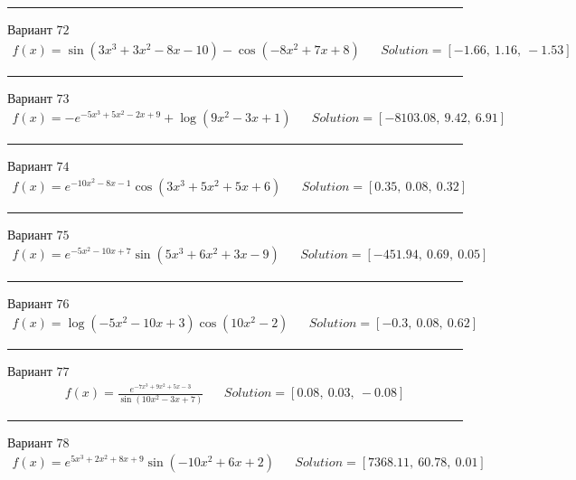 \documentclass[11pt]{report}
\begin{document}
\begin{center}
    \noindent\rule{8cm}{0.4pt}
\end{center}
Вариант \(72\)
\begin{align*}
    f(x) = \sin{\left(3 x^{3} + 3 x^{2} - 8 x - 10 \right)} - \cos{\left(- 8 x^{2} + 7 x + 8 \right)} && Solution = \left[ -1.66, \  1.16, \  -1.53\right]
\end{align*}
\begin{center}
    \noindent\rule{8cm}{0.4pt}
\end{center}
Вариант \(73\)
\begin{align*}
    f(x) = - e^{- 5 x^{3} + 5 x^{2} - 2 x + 9} + \log{\left(9 x^{2} - 3 x + 1 \right)} && Solution = \left[ -8103.08, \  9.42, \  6.91\right]
\end{align*}
\begin{center}
    \noindent\rule{8cm}{0.4pt}
\end{center}
Вариант \(74\)
\begin{align*}
    f(x) = e^{- 10 x^{2} - 8 x - 1} \cos{\left(3 x^{3} + 5 x^{2} + 5 x + 6 \right)} && Solution = \left[ 0.35, \  0.08, \  0.32\right]
\end{align*}
\begin{center}
    \noindent\rule{8cm}{0.4pt}
\end{center}
Вариант \(75\)
\begin{align*}
    f(x) = e^{- 5 x^{2} - 10 x + 7} \sin{\left(5 x^{3} + 6 x^{2} + 3 x - 9 \right)} && Solution = \left[ -451.94, \  0.69, \  0.05\right]
\end{align*}
\begin{center}
    \noindent\rule{8cm}{0.4pt}
\end{center}
Вариант \(76\)
\begin{align*}
    f(x) = \log{\left(- 5 x^{2} - 10 x + 3 \right)} \cos{\left(10 x^{2} - 2 \right)} && Solution = \left[ -0.3, \  0.08, \  0.62\right]
\end{align*}
\begin{center}
    \noindent\rule{8cm}{0.4pt}
\end{center}
Вариант \(77\)
\begin{align*}
    f(x) = \frac{e^{- 7 x^{3} + 9 x^{2} + 5 x - 3}}{\sin{\left(10 x^{2} - 3 x + 7 \right)}} && Solution = \left[ 0.08, \  0.03, \  -0.08\right]
\end{align*}
\begin{center}
    \noindent\rule{8cm}{0.4pt}
\end{center}
Вариант \(78\)
\begin{align*}
    f(x) = e^{5 x^{3} + 2 x^{2} + 8 x + 9} \sin{\left(- 10 x^{2} + 6 x + 2 \right)} && Solution = \left[ 7368.11, \  60.78, \  0.01\right]
\end{align*}
\end{document}
